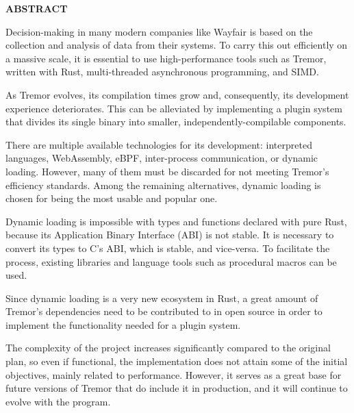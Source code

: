 
\begin{center}
{\LARGE \bfseries ABSTRACT}

\vspace{2.5cm}
\end{center}

Decision-making in many modern companies like Wayfair is based on the collection
and analysis of data from their systems. To carry this out efficiently on a
massive scale, it is essential to use high-performance tools such as Tremor,
written with Rust, multi-threaded asynchronous programming, and SIMD.

As Tremor evolves, its compilation times grow and, consequently, its development
experience deteriorates. This can be alleviated by implementing a plugin system
that divides its single binary into smaller, independently-compilable
components.

There are multiple available technologies for its development: interpreted
languages, WebAssembly, eBPF, inter-process communication, or dynamic loading.
However, many of them must be discarded for not meeting Tremor's efficiency
standards. Among the remaining alternatives, dynamic loading is chosen for being
the most usable and popular one.

Dynamic loading is impossible with types and functions declared with pure Rust,
because its Application Binary Interface (ABI) is not stable. It is necessary to
convert its types to C's ABI, which is stable, and vice-versa. To facilitate the
process, existing libraries and language tools such as procedural macros can be
used.

Since dynamic loading is a very new ecosystem in Rust, a great amount of
Tremor's dependencies need to be contributed to in open source in order to
implement the functionality needed for a plugin system.

The complexity of the project increases significantly compared to the original
plan, so even if functional, the implementation does not attain some of the
initial objectives, mainly related to performance. However, it serves as a great
base for future versions of Tremor that do include it in production, and it will
continue to evolve with the program.
